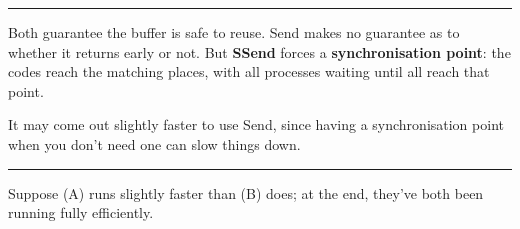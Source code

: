 \begin{Shaded}
\begin{Highlighting}[]

      \NormalTok{;}
       \NormalTok{) \{}
           
           \NormalTok{(}\NormalTok{, }
         \NormalTok{; }
      \NormalTok{\}}
       \NormalTok{) \{}
           \NormalTok{buffer[}\NormalTok{];}
            
            \NormalTok{, }
      \NormalTok{\}}
\end{Highlighting}
\end{Shaded}

\begin{center}\rule{3in}{0.4pt}\end{center}

Both guarantee the buffer is safe to reuse. Send makes no guarantee as
to whether it returns early or not. But \textbf{SSend} forces a
\textbf{synchronisation point}: the codes reach the matching places,
with all processes waiting until all reach that point.

It may come out slightly faster to use Send, since having a
synchronisation point when you don't need one can slow things down.

\begin{center}\rule{3in}{0.4pt}\end{center}

Suppose (A) runs slightly faster than (B) does; at the end, they've both
been running fully efficiently.

